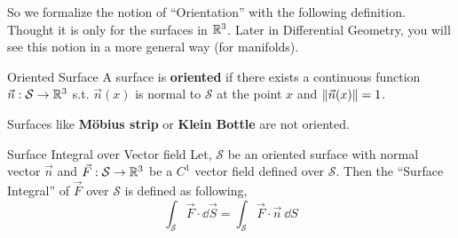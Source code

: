 \documentclass[../Analysis-3]{subfiles}
\begin{document}
So we formalize the notion of ``Orientation'' with the following definition. Thought it is only for the surfaces in $ \mathbb{R}^3 $. Later in Differential Geometry, you will see this notion in a more general way (for manifolds).

\begin{Def}{Oriented Surface}{}
    A surface is \textbf{oriented} if there exists a continuous function $\vec{n} : \mathcal{S} \to \mathbb{R}^3$ s.t. $\vec{n}(x)$ is normal to $\mathcal{S}$ at the point $x$ and $\norm{\vec{n}(x)} = 1$.
\end{Def}

Surfaces like \textbf{Möbius strip} or \textbf{Klein Bottle} are not oriented.

\begin{Def}{Surface Integral over Vector field}{}
    Let, $\mathcal{S}$ be an oriented surface with normal vector $\vec{n}$ and $\vec{F} : \mathcal{S} \to \mathbb{R}^3$ be a $C^1$ vector field defined over $\mathcal{S}$. Then the ``Surface Integral'' of $\vec{F}$ over $\mathcal{S}$ is defined as following,
    \[ \int_{\mathcal{S}} \vec{F} \cdot \dd \vec{S} = \int_{\mathcal{S}} \vec{F}\cdot\vec{n}\ \dd S \]
\end{Def}
\end{document}
